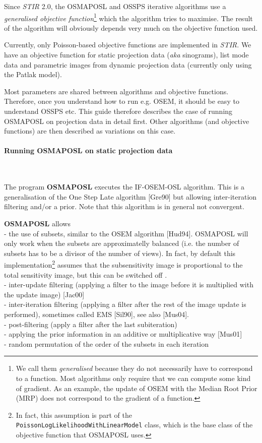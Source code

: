 \documentclass{article}
\newcommand{\tab}{\hspace{5mm}}
\newcommand{\subsubsubsection}[1]{\paragraph{#1}\mbox{} \\}
\begin{document}
Since \textit{STIR} 2.0, the OSMAPOSL and OSSPS iterative algorithms use a \textit{generalised objective
function}\footnote{We call them \textit{generalised} because they do not
necessarily have to correspond to a function. Most algorithms only require
that we can compute some kind of gradient. As an example, the update
of OSEM with the Median Root Prior (MRP) does not correspond to the
gradient of a function.} which the algorithm tries to maximise. The result
of the algorithm will obviously depends very much on the objective function
used.

Currently, only Poisson-based objective functions are implemented in \textit{STIR}. We
have an objective function for static projection data (\textit{aka} sinograms),
list mode data and parametric images from dynamic projection data 
(currently only using the Patlak model).

Most parameters are shared between algorithms and objective functions. Therefore,
once you understand how to run e.g. OSEM, it should be easy to understand OSSPS etc.
This guide therefore describes the case of running OSMAPOSL on projection data in detail
first. Other algorithms (and objective functions) are then described as variations on this
case.

{ \subsubsubsection{Running OSMAPOSL on static projection data}
}
\label{sec:OSMAPOSL}

The program \textbf{OSMAPOSL} executes the IF-OSEM-OSL algorithm. 
This is a generalisation of the One Step Late algorithm [Gre90] but allowing
inter-iteration filtering and/or a prior. Note that this 
algorithm is in general not convergent.

\textbf{OSMAPOSL} 
allows \\
-\tab 
the use of subsets, similar to the OSEM algorithm [Hud94]. OSMAPOSL
will only work when the subsets are approximatelly balanced (i.e.
the number of subsets has to be a divisor of the number of views).
In fact, by default this implementation\footnote{In fact, this assumption
is part of the \texttt{PoissonLogLikelihoodWithLinearModel} class, which is
the base class of the objective function that OSMAPOSL uses.} assumes that the 
subsensitivity image is proportional to the total sensitivity image,
but this can be switched off .\\
-\tab 
inter-update filtering (applying a filter to the image before 
it is multiplied with the update image) [Jac00]\\
-\tab 
inter-iteration filtering (applying a filter after the rest of 
the image update is performed), sometimes called EMS [Sil90], 
see also [Mus04].\\
-\tab 
post-filtering (apply a filter after the last subiteration)\\
-\tab 
applying the prior information in an additive or multiplicative 
way [Mus01]\\
-\tab 
random permutation of the order of the subsets in each iteration
\end{document}
